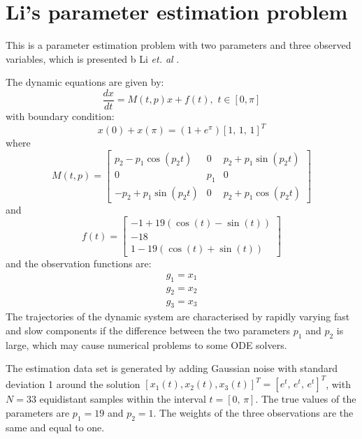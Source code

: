 \documentclass[a4paper,11pt]{report}    %
\begin{document}
\section{Li's parameter estimation problem}

This is a parameter estimation problem with two parameters and three observed variables, which is presented b Li \emph{et. al} \cite{Li:2005}.

The dynamic equations are given by:
\begin{equation}
  \frac{d x} {dt} = M(t,p) x + f(t), \,\, t \in [0, \pi]
\end{equation}
with boundary condition:
\[
  x(0) + x(\pi) = (1 + e^{\pi})\left[ 1, \, 1, \, 1\right]^T
\]
where
\begin{equation}
  M(t,p) = \begin{bmatrix} 
   p_2 - p_1 \cos(p_2 t) & 0 & p_2 + p_1\sin(p_2t)  \\
   0 &   p_1 & 0 \\
   -p_2 + p_1 \sin(p_2 t) & 0 & p_2 + p_1 \cos(p_2 t) 
 \end{bmatrix}
\end{equation}
and
\begin{equation}
  f(t) =  \begin{bmatrix} 
    -1 + 19(\cos(t) - \sin(t)) \\
    -18 \\
    1- 19(\cos(t) + \sin(t))
  \end{bmatrix}
\end{equation}
and the observation functions are:
\begin{equation}
\begin{aligned}
  g_1 = x_1 \\
  g_2 = x_2 \\
  g_3 = x_3
\end{aligned}
\end{equation}
The trajectories of the dynamic system are characterised by rapidly varying fast and slow components if the difference between the two parameters $p_1$ and $p_2$ is large, which may cause numerical problems to some ODE solvers. 

The estimation data set is generated by adding Gaussian noise with standard deviation 1 around the solution $[x_1(t), x_2(t), x_3(t)]^T = [e^t,\, e^t,\, e^t]^T$, with $N=33$ equidistant samples within the interval $t=[0,\,\pi]$. The true values of the parameters are $p_1 = 19$ and $p_2 = 1$. The weights of the three observations are the same and equal to one. 
\end{document}
